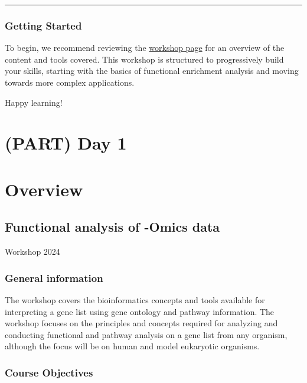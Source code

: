 \documentclass[
]{book}
\begin{document}
\begin{center}\rule{0.5\linewidth}{0.5pt}\end{center}

\hypertarget{getting-started}{%
\subsection{Getting Started}\label{getting-started}}

To begin, we recommend reviewing the \href{https://monashbioinformaticsplatform.github.io/Functional_Enrichment_BioCommons_2024/}{workshop page} for an overview of the content and tools covered. This workshop is structured to progressively build your skills, starting with the basics of functional enrichment analysis and moving towards more complex applications.

Happy learning!

\hypertarget{part-day-1}{%
\chapter{(PART) Day 1}\label{part-day-1}}

\hypertarget{overview}{%
\chapter{Overview}\label{overview}}

\hypertarget{functional-analysis-of--omics-data}{%
\section{Functional analysis of -Omics data}\label{functional-analysis-of--omics-data}}

Workshop 2024

\hypertarget{general-information}{%
\subsection{General information}\label{general-information}}

The workshop covers the bioinformatics concepts and tools available for interpreting a gene list using gene ontology and pathway information. The workshop focuses on the principles and concepts required for analyzing and conducting functional and pathway analysis on a gene list from any organism, although the focus will be on human and model eukaryotic organisms.

\hypertarget{course-objectives}{%
\subsection{Course Objectives}\label{course-objectives}}
\end{document}
